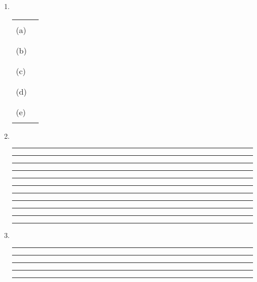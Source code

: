 \documentclass[a4paper,10pt]{article}
\begin{document}
\vspace*{-1cm} 

\EXTESTAHEADING{\INTERNO}{\INTERTESTDATE}

\begin{enumerate}
\item~

\begin{tabular}{p{1.5cm}|p{2cm}|}
\cline{2-2}
&  \\
(a) & \\ & \\
\cline{2-2}
&  \\
(b) & \\ & \\
\cline{2-2}
&  \\
(c) & \\ & \\
\cline{2-2}
&  \\
(d) & \\ & \\
\cline{2-2}
&  \\
(e) & \\ & \\ 
\cline{2-2}
\end{tabular}


\item~

\vspace{7mm}\hrule\vspace{7mm}\hrule\vspace{7mm}\hrule\vspace{7mm}\hrule
\vspace{7mm}\hrule\vspace{7mm}\hrule\vspace{7mm}\hrule\vspace{7mm}\hrule
\vspace{7mm}\hrule\vspace{7mm}\hrule\vspace{7mm}\hrule\vspace{3mm}

\newpage

\item~

\vspace{7mm}\hrule\vspace{7mm}\hrule\vspace{7mm}\hrule\vspace{7mm}\hrule
\vspace{7mm}\hrule\vspace{3mm}



\end{enumerate}
\end{document}

